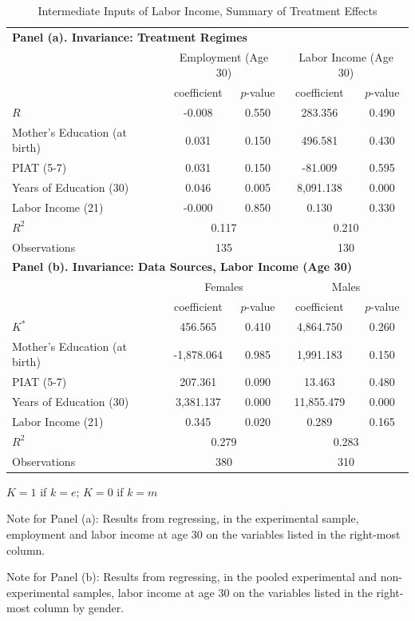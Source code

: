 \begin{table}[!htpb]
\begin{threeparttable}
\caption{Intermediate Inputs of Labor Income, Summary of Treatment Effects} \label{table:invariance}
\centering
\begin{tabular}{lcccc} \toprule
 \multicolumn{5}{l}{\textbf{Panel (a). Invariance: Treatment Regimes}} \\ 
       & \multicolumn{2}{c}{Employment (Age 30)} &   \multicolumn{2}{c}{Labor Income (Age 30)} \\
       			      & coefficient & $p$-value & coefficient & $p$-value \\
$R$ &-0.008 & 0.550 & 283.356 & 0.490 \\
Mother's Education (at birth) & 0.031 & 0.150 & 496.581 & 0.430 \\
PIAT (5-7) & 0.031 & 0.150 & -81.009 & 0.595 \\
Years of Education (30) & 0.046 & 0.005 & 8,091.138 & 0.000 \\
Labor Income (21) & -0.000 & 0.850 & 0.130 & 0.330 \\
$R^2$ & \multicolumn{2}{c}{0.117} & \multicolumn{2}{c}{0.210}  \\ 
Observations & \multicolumn{2}{c}{135} &  \multicolumn{2}{c}{130}  \\ \midrule
 \multicolumn{5}{l}{\textbf{Panel (b). Invariance: Data Sources, Labor Income (Age 30)}} \\
       & \multicolumn{2}{c}{Females} &   \multicolumn{2}{c}{Males} \\
       			      & coefficient & $p$-value & coefficient & $p$-value \\
$K^*$ & 456.565 & 0.410  & 4,864.750 & 0.260 \\
Mother's Education (at birth) & -1,878.064 & 0.985  & 1,991.183 & 0.150 \\
PIAT (5-7) & 207.361 & 0.090 & 13.463 & 0.480 \\
Years of Education (30) & 3,381.137 & 0.000 & 11,855.479 & 0.000 \\
Labor Income (21) & 0.345 & 0.020 & 0.289 & 0.165 \\ 
$R^2$ & \multicolumn{2}{c}{0.279}  & \multicolumn{2}{c}{0.283}  \\ 
Observations & \multicolumn{2}{c}{380} & \multicolumn{2}{c}{310} \\ \bottomrule
\end{tabular}
\begin{tablenotes}
\footnotesize
\item * $K = 1$ if $k = e$; $K = 0$ if $k = m$\\
\item Note for Panel (a): Results from regressing, in the experimental sample, employment and labor income at age 30 on the variables listed in the right-most column. \\
\item Note for Panel (b): Results from regressing, in the pooled experimental and non-experimental  samples, labor income at age 30 on the variables listed in the right-most column by gender.
\end{tablenotes}
\end{threeparttable}
\end{table}

